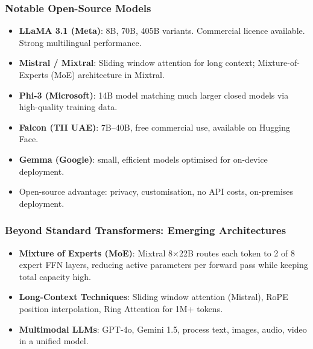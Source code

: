 \begin{frame}[fragile]\frametitle{Notable Open-Source Models}
\begin{itemize}
\item \textbf{LLaMA 3.1 (Meta)}: 8B, 70B, 405B variants.  Commercial licence available. Strong multilingual performance.
\item \textbf{Mistral / Mixtral}: Sliding window attention for long context; Mixture-of-Experts (MoE) architecture in Mixtral.
\item \textbf{Phi-3 (Microsoft)}: 14B model matching much larger closed models via high-quality training data.
\item \textbf{Falcon (TII UAE)}: 7B–40B, free commercial use, available on Hugging Face.
\item \textbf{Gemma (Google)}: small, efficient models optimised for on-device deployment.
\item Open-source advantage: privacy, customisation, no API costs, on-premises deployment.
\end{itemize}
\end{frame}

\begin{frame}[fragile]\frametitle{Beyond Standard Transformers: Emerging Architectures}
\begin{itemize}
\item \textbf{Mixture of Experts (MoE)}: Mixtral 8×22B routes each token to 2 of 8 expert FFN layers, reducing active parameters per forward pass while keeping total capacity high.
\item \textbf{Long-Context Techniques}: Sliding window attention (Mistral), RoPE position interpolation, Ring Attention for 1M+ tokens.
\item \textbf{Multimodal LLMs}: GPT-4o, Gemini 1.5, process text, images, audio, video in a unified model.
\end{itemize}
\end{frame}



